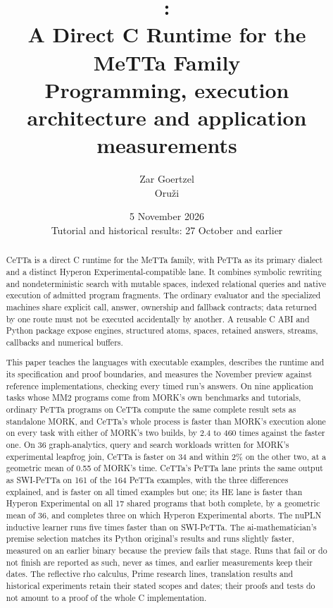 \documentclass[11pt]{article}
\title{\CeTTa{}:\\
\large A Direct C Runtime for the MeTTa Family\\[2pt]
\normalsize Programming, execution architecture and application measurements}
\author{Zar Goertzel\\Oru\v{z}i}
\date{5 November 2026\\\small Tutorial and historical results: 27 October and earlier}
\newcommand{\PeTTa}{\textup{PeTTa}}
\newcommand{\HE}{\textup{HE}}
\newcommand{\CeTTa}{\textup{CeTTa}}
\begin{document}
\maketitle

\begin{abstract}
\CeTTa{} is a direct C runtime for the MeTTa family, with \PeTTa{} as its
primary dialect and a distinct Hyperon Experimental-compatible lane.  It
combines symbolic rewriting and nondeterministic search with mutable spaces,
indexed relational queries and native execution of admitted program fragments.
The ordinary evaluator and the specialized machines share explicit call,
answer, ownership and fallback contracts; data returned by one route must not
be executed accidentally by another.  A reusable C ABI and Python package
expose engines, structured atoms, spaces, retained answers, streams, callbacks
and numerical buffers.

This paper teaches the languages with executable examples, describes the
runtime and its specification and proof boundaries, and measures the November
preview against reference implementations, checking every timed run's answers.
On nine application tasks whose MM2 programs come from MORK's own benchmarks
and tutorials, ordinary \PeTTa{} programs on \CeTTa{} compute the same complete
result sets as standalone MORK, and \CeTTa{}'s whole process is faster than
MORK's execution alone on every task with either of MORK's two builds, by 2.4
to 460 times against the faster one.  On 36 graph-analytics, query and search
workloads written for MORK's experimental leapfrog join, \CeTTa{} is faster on
34 and within 2\% on the other two, at a geometric mean of 0.55 of MORK's time.
\CeTTa{}'s \PeTTa{} lane prints the same output as SWI-\PeTTa{} on 161 of the
164 \PeTTa{} examples, with the three differences explained, and is faster on
all timed examples but one; its \HE{} lane is faster than Hyperon Experimental
on all 17 shared programs that both complete, by a geometric mean of 36, and
completes three on which Hyperon Experimental aborts.  The nuPLN inductive
learner runs five times faster than on SWI-\PeTTa{}.  The ai-mathematician's
premise selection matches its Python original's results and runs slightly
faster, measured on an earlier binary because the preview fails that stage.
Runs that fail or do not finish are reported as such, never as times, and
earlier measurements keep their dates.  The reflective rho calculus, Prime
research lines, translation results and historical experiments retain their
stated scopes and dates; their proofs and tests do not amount to a proof of
the whole C implementation.
\end{abstract}
\end{document}
